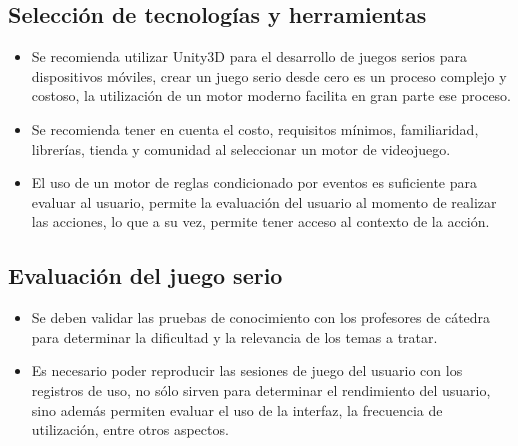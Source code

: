 \subsection{Selección de tecnologías y herramientas}

\begin{itemize}

\item Se recomienda utilizar Unity3D para el desarrollo de juegos serios para
dispositivos móviles, crear un juego serio desde cero es un proceso complejo y 
costoso, la utilización de un motor moderno facilita en 
gran parte ese proceso.

\item Se recomienda tener en cuenta el costo, requisitos mínimos, familiaridad,
    librerías, tienda y comunidad al seleccionar un motor de videojuego.
    
\item El uso de un motor de reglas condicionado por eventos es suficiente para
    evaluar al usuario, permite la evaluación del usuario al momento de realizar
    las acciones, lo que a su vez, permite tener acceso al contexto de la
    acción. 

\end{itemize}

\subsection{Evaluación del juego serio}

\begin{itemize}

\item Se deben validar las pruebas de conocimiento con los profesores de cátedra para
    determinar la dificultad y la relevancia de los temas a tratar.

\item Es necesario poder reproducir las sesiones de juego del usuario con los registros 
	de uso, no sólo sirven para
    determinar el rendimiento del usuario, sino además permiten evaluar el uso
    de la interfaz, la frecuencia de utilización, entre otros aspectos.


\end{itemize}

